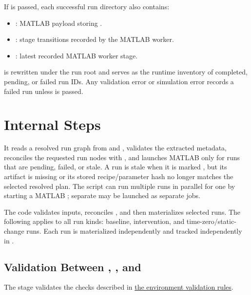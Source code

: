 \documentclass[11pt]{article}
\begin{document}
If  is passed, each successful run directory also contains:

\begin{itemize}
\item {}: MATLAB payload storing .
\item {}: stage transitions recorded by the MATLAB worker.
\item {}: latest recorded MATLAB worker stage.
\end{itemize}

 is rewritten under the run root and serves as the runtime inventory of completed, pending, or failed run IDs.
Any validation error or simulation error records a failed run unless  is passed.


\section*{Internal Steps}
It reads a resolved run graph from  and , validates the extracted \termSimulator metadata, reconciles the requested run nodes with , and launches MATLAB only for runs that are pending, failed, or stale.
A run is stale when it is marked , but its artifact is missing or its stored recipe/parameter hash no longer matches the selected resolved plan.
The script can run multiple runs in parallel for one \termSimulator by starting a MATLAB ; separate \termSimulators may be launched as separate jobs.

The code validates inputs, reconciles , and then materializes selected runs.
The following applies to all run kinds: baseline, intervention, and time-zero/static-change runs.
Each run is materialized independently and tracked independently in .

\subsection*{Validation Between , , and }

The stage validates the checks described in \hyperref[sec:environment-validation-rules]{the environment validation rules}.
\end{document}
